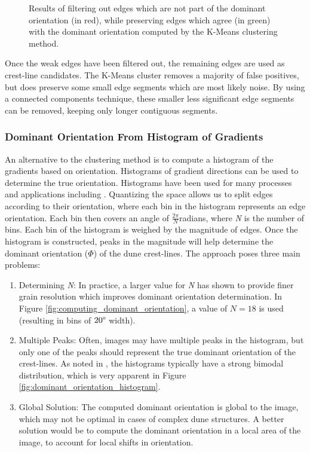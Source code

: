   \begin{figure}
  	\centering
  	\caption{Results of filtering out edges which are not part of the dominant orientation (in red), while preserving edges which agree (in green) with the dominant orientation computed by the K-Means clustering method.}
  	\label{fig:kmeans_edge_results}
  \end{figure}
  
  Once the weak edges have been filtered out, the remaining edges are used as crest-line candidates. The K-Means cluster removes a majority of false positives, but does preserve some small edge segments which are most likely noise. By using a connected components technique, these smaller less significant edge segments can be removed, keeping only longer contiguous segments.
  
  \subsubsection{Dominant Orientation From Histogram of Gradients} \label{subsec:dominant_orientation_histogram_of_gradients}
  
An alternative to the clustering method is to compute a histogram of the gradients based on orientation. Histograms of gradient directions can be used to determine the true orientation. Histograms have been used for many processes and applications including \cite{lowe_sift_paper, dalal_histogram_oriented_gradients_human_detection, hu_gradient_field_descriptor}. Quantizing the space allows us to split edges according to their orientation, where each bin in the histogram represents an edge orientation. Each bin then covers an angle of $\frac{2\pi}{N}$radians, where \emph{N} is the number of bins. Each bin of the histogram is weighed by the magnitude of edges. Once the histogram is constructed, peaks in the magnitude will help determine the dominant orientation ($\varPhi$) of the dune crest-lines. The approach poses three main problems:
  
  \begin{enumerate}
  	\item Determining \emph{N}: In practice, a larger value for \emph{N} has shown to provide finer grain resolution which improves dominant orientation determination. In Figure \ref{fig:computing_dominant_orientation}, a value of $N=18$ is used (resulting in bins of $20\degree$ width).
  	\item Multiple Peaks: Often, images may have multiple peaks in the histogram, but only one of the peaks should represent the true dominant orientation of the crest-lines. As noted in \cite{2015_automated_mapping_of_linear_dunefield}, the histograms typically have a strong bimodal distribution, which is very apparent in Figure \ref{fig:dominant_orientation_histogram}.
  	\item Global Solution: The computed dominant orientation is global to the image, which may not be optimal in cases of complex dune structures. A better solution would be to compute the dominant orientation in a local area of the image, to account for local shifts in orientation.
  \end{enumerate}
  
